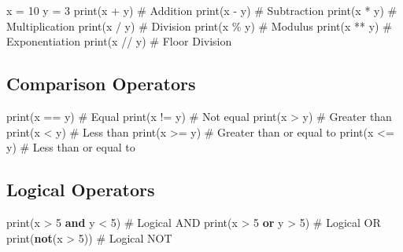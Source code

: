 \documentclass[
  letterpaper,
  DIV=11,
  numbers=noendperiod]{scrreprt}
\newenvironment{Shaded}{\begin{snugshade}}{\end{snugshade}}
\newcommand{\BuiltInTok}[1]{\textcolor[rgb]{0.00,0.23,0.31}{#1}}
\newcommand{\CommentTok}[1]{\textcolor[rgb]{0.37,0.37,0.37}{#1}}
\newcommand{\DecValTok}[1]{\textcolor[rgb]{0.68,0.00,0.00}{#1}}
\newcommand{\KeywordTok}[1]{\textcolor[rgb]{0.00,0.23,0.31}{\textbf{#1}}}
\newcommand{\NormalTok}[1]{\textcolor[rgb]{0.00,0.23,0.31}{#1}}
\newcommand{\OperatorTok}[1]{\textcolor[rgb]{0.37,0.37,0.37}{#1}}
\begin{document}
\begin{Shaded}
\begin{Highlighting}[]
\NormalTok{x }\OperatorTok{=} \DecValTok{10}
\NormalTok{y }\OperatorTok{=} \DecValTok{3}
\BuiltInTok{print}\NormalTok{(x }\OperatorTok{+}\NormalTok{ y)  }\CommentTok{\# Addition}
\BuiltInTok{print}\NormalTok{(x }\OperatorTok{{-}}\NormalTok{ y)  }\CommentTok{\# Subtraction}
\BuiltInTok{print}\NormalTok{(x }\OperatorTok{*}\NormalTok{ y)  }\CommentTok{\# Multiplication}
\BuiltInTok{print}\NormalTok{(x }\OperatorTok{/}\NormalTok{ y)  }\CommentTok{\# Division}
\BuiltInTok{print}\NormalTok{(x }\OperatorTok{\%}\NormalTok{ y)  }\CommentTok{\# Modulus}
\BuiltInTok{print}\NormalTok{(x }\OperatorTok{**}\NormalTok{ y) }\CommentTok{\# Exponentiation}
\BuiltInTok{print}\NormalTok{(x }\OperatorTok{//}\NormalTok{ y) }\CommentTok{\# Floor Division}
\end{Highlighting}
\end{Shaded}

\subsection{Comparison Operators}\label{comparison-operators}

\begin{Shaded}
\begin{Highlighting}[]
\BuiltInTok{print}\NormalTok{(x }\OperatorTok{==}\NormalTok{ y)  }\CommentTok{\# Equal}
\BuiltInTok{print}\NormalTok{(x }\OperatorTok{!=}\NormalTok{ y)  }\CommentTok{\# Not equal}
\BuiltInTok{print}\NormalTok{(x }\OperatorTok{\textgreater{}}\NormalTok{ y)   }\CommentTok{\# Greater than}
\BuiltInTok{print}\NormalTok{(x }\OperatorTok{\textless{}}\NormalTok{ y)   }\CommentTok{\# Less than}
\BuiltInTok{print}\NormalTok{(x }\OperatorTok{\textgreater{}=}\NormalTok{ y)  }\CommentTok{\# Greater than or equal to}
\BuiltInTok{print}\NormalTok{(x }\OperatorTok{\textless{}=}\NormalTok{ y)  }\CommentTok{\# Less than or equal to}
\end{Highlighting}
\end{Shaded}

\subsection{Logical Operators}\label{logical-operators}

\begin{Shaded}
\begin{Highlighting}[]
\BuiltInTok{print}\NormalTok{(x }\OperatorTok{\textgreater{}} \DecValTok{5} \KeywordTok{and}\NormalTok{ y }\OperatorTok{\textless{}} \DecValTok{5}\NormalTok{)  }\CommentTok{\# Logical AND}
\BuiltInTok{print}\NormalTok{(x }\OperatorTok{\textgreater{}} \DecValTok{5} \KeywordTok{or}\NormalTok{ y }\OperatorTok{\textgreater{}} \DecValTok{5}\NormalTok{)   }\CommentTok{\# Logical OR}
\BuiltInTok{print}\NormalTok{(}\KeywordTok{not}\NormalTok{(x }\OperatorTok{\textgreater{}} \DecValTok{5}\NormalTok{))       }\CommentTok{\# Logical NOT}
\end{Highlighting}
\end{Shaded}
\end{document}
